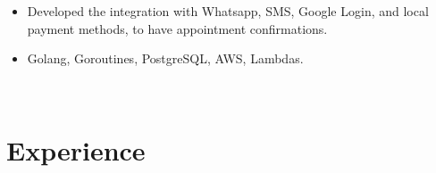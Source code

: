 \documentclass[letterpaper]{twentysecondcv} %
\begin{document}
\begin{twenty}
{        \begin{itemize}
            \item
            Developed the integration with Whatsapp, SMS, Google Login, and local payment methods, to have appointment confirmations.
        \end{itemize}
         
         \begin{itemize}
            \item
            Golang, Goroutines, PostgreSQL, AWS, Lambdas.
         \end{itemize}
         
    }
    \\
    

    
    
         
         
    
\end{twenty}

\section{Experience}
\end{document}
